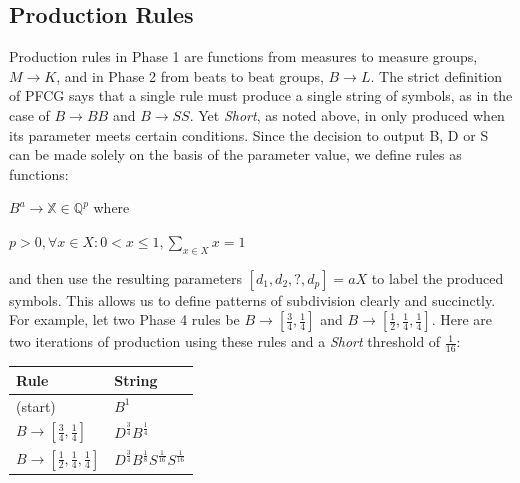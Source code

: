 \documentclass{article}
\begin{document}








\subsection{Production Rules}

Production rules in Phase 1 are functions from measures to measure groups, $M \rightarrow K$, and in Phase 2 from beats to beat groups, $B \rightarrow L$. The strict definition of PFCG says that a single rule must produce a single string of symbols, as in the case of $B \rightarrow BB$ and $B \rightarrow SS$.  Yet \emph{Short}, as noted above, in only produced when its parameter meets certain conditions. Since the decision to output B, D or S can be made solely on the basis of the parameter value, we define rules as functions:

$B^a \rightarrow \mathbb{X} \in \mathbb{Q}^{p}$ where 

$p > 0 , \forall x \in X: 0 < x \leq 1, \sum_{x \in X} x = 1$

and then use the resulting parameters $[d_1,d_2,?,d_p]=aX$ to label the produced symbols. This allows us to define patterns of subdivision clearly and succinctly. For example, let two Phase 4 rules be $B \rightarrow [\frac{3}{4}, \frac{1}{4}]$ and $B \rightarrow [\frac{1}{2}, \frac{1}{4}, \frac{1}{4}]$. Here are two iterations of production using these rules and a \emph{Short} threshold of $\frac{1}{16}$:

\bgroup
\def\arraystretch{1.5}
\begin{center}
\begin{tabular}{ l l }
 Rule & String \\
 \hline
 (start)                                                  & $B^{1}$ \\
 $B \rightarrow [\frac{3}{4}, \frac{1}{4}]$               & $D^{\frac{3}{4}} B^{\frac{1}{4}}$ \\
 $B \rightarrow [\frac{1}{2}, \frac{1}{4}, \frac{1}{4}]$  & $D^{\frac{3}{4}} B^{\frac{1}{8}} S^{\frac{1}{16}} S^{\frac{1}{16}}$ \\
\end{tabular}
\end{center}
\egroup
\end{document}
